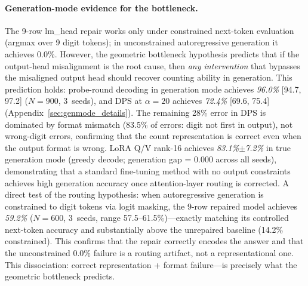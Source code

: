 \documentclass{article}
\begin{document}
\paragraph{Generation-mode evidence for the bottleneck.}
The 9-row lm\_head repair works only under constrained next-token evaluation (argmax over 9 digit tokens); in unconstrained autoregressive generation it achieves 0.0\%. However, the geometric bottleneck hypothesis predicts that if the output-head misalignment is the root cause, then \emph{any intervention} that bypasses the misaligned output head should recover counting ability in generation. This prediction holds: probe-round decoding in generation mode achieves \emph{96.0\%} [94.7, 97.2] ($N{=}900$, 3~seeds), and DPS at $\alpha{=}20$ achieves \emph{72.4\%} [69.6, 75.4] (Appendix~\ref{sec:genmode_details}). The remaining 28\% error in DPS is dominated by format mismatch (83.5\% of errors: digit not first in output), not wrong-digit errors, confirming that the count representation is correct even when the output format is wrong. LoRA Q/V rank-16 achieves \emph{83.1\%$\pm$7.2\%} in true generation mode (greedy decode; generation gap = 0.000 across all seeds), demonstrating that a standard fine-tuning method with no output constraints achieves high generation accuracy once attention-layer routing is corrected.
A direct test of the routing hypothesis: when autoregressive generation is constrained to digit tokens via logit masking, the 9-row repaired model achieves \emph{59.2\%} ($N{=}600$, 3~seeds, range 57.5--61.5\%)---exactly matching its controlled next-token accuracy and substantially above the unrepaired baseline (14.2\% constrained). This confirms that the repair correctly encodes the answer and that the unconstrained 0.0\% failure is a routing artifact, not a representational one.
This dissociation: correct representation + format failure---is precisely what the geometric bottleneck predicts.
\end{document}
